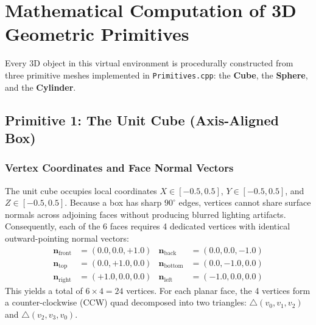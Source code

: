 \documentclass[11pt,a4paper]{article}
\begin{document}
\section{Mathematical Computation of 3D Geometric Primitives}

Every 3D object in this virtual environment is procedurally constructed from three primitive meshes implemented in \texttt{Primitives.cpp}: the \textbf{Cube}, the \textbf{Sphere}, and the \textbf{Cylinder}.

\subsection{Primitive 1: The Unit Cube (Axis-Aligned Box)}

\subsubsection{Vertex Coordinates and Face Normal Vectors}
The unit cube occupies local coordinates $X \in [-0.5, 0.5]$, $Y \in [-0.5, 0.5]$, and $Z \in [-0.5, 0.5]$. Because a box has sharp $90^\circ$ edges, vertices cannot share surface normals across adjoining faces without producing blurred lighting artifacts. Consequently, each of the 6 faces requires 4 dedicated vertices with identical outward-pointing normal vectors:
\begin{align}
    \mathbf{n}_{\text{front}}  &= (0.0, 0.0, +1.0) & \mathbf{n}_{\text{back}}   &= (0.0, 0.0, -1.0) \\
    \mathbf{n}_{\text{top}}    &= (0.0, +1.0, 0.0) & \mathbf{n}_{\text{bottom}} &= (0.0, -1.0, 0.0) \\
    \mathbf{n}_{\text{right}}  &= (+1.0, 0.0, 0.0) & \mathbf{n}_{\text{left}}   &= (-1.0, 0.0, 0.0)
\end{align}
This yields a total of $6 \times 4 = 24$ vertices. For each planar face, the 4 vertices form a counter-clockwise (CCW) quad decomposed into two triangles: $\triangle(v_0, v_1, v_2)$ and $\triangle(v_2, v_3, v_0)$.
\end{document}
